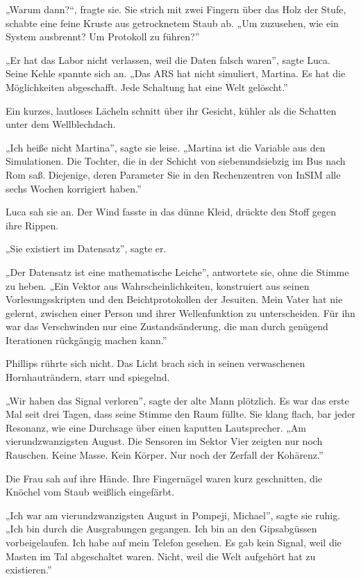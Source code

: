 \documentclass[
  ngerman,
]{article}
\begin{document}
„Warum dann?``, fragte sie. Sie strich mit zwei Fingern über das Holz
der Stufe, schabte eine feine Kruste aus getrocknetem Staub ab. „Um
zuzusehen, wie ein System ausbrennt? Um Protokoll zu führen?''

„Er hat das Labor nicht verlassen, weil die Daten falsch waren'', sagte
Luca. Seine Kehle spannte sich an. „Das ARS hat nicht simuliert,
Martina. Es hat die Möglichkeiten abgeschafft. Jede Schaltung hat eine
Welt gelöscht.''

Ein kurzes, lautloses Lächeln schnitt über ihr Gesicht, kühler als die
Schatten unter dem Wellblechdach.

„Ich heiße nicht Martina'', sagte sie leise. „Martina ist die Variable
aus den Simulationen. Die Tochter, die in der Schicht von
siebenundsiebzig im Bus nach Rom saß. Diejenige, deren Parameter Sie in
den Rechenzentren von InSIM alle sechs Wochen korrigiert haben.''

Luca sah sie an. Der Wind fasste in das dünne Kleid, drückte den Stoff
gegen ihre Rippen.

„Sie existiert im Datensatz'', sagte er.

„Der Datensatz ist eine mathematische Leiche'', antwortete sie, ohne die
Stimme zu heben. „Ein Vektor aus Wahrscheinlichkeiten, konstruiert aus
seinen Vorlesungsskripten und den Beichtprotokollen der Jesuiten. Mein
Vater hat nie gelernt, zwischen einer Person und ihrer Wellenfunktion zu
unterscheiden. Für ihn war das Verschwinden nur eine Zustandsänderung,
die man durch genügend Iterationen rückgängig machen kann.''

Phillips rührte sich nicht. Das Licht brach sich in seinen verwaschenen
Hornhauträndern, starr und spiegelnd.

„Wir haben das Signal verloren'', sagte der alte Mann plötzlich. Es war
das erste Mal seit drei Tagen, dass seine Stimme den Raum füllte. Sie
klang flach, bar jeder Resonanz, wie eine Durchsage über einen kaputten
Lautsprecher. „Am vierundzwanzigsten August. Die Sensoren im Sektor Vier
zeigten nur noch Rauschen. Keine Masse. Kein Körper. Nur noch der
Zerfall der Kohärenz.''

Die Frau sah auf ihre Hände. Ihre Fingernägel waren kurz geschnitten,
die Knöchel vom Staub weißlich eingefärbt.

„Ich war am vierundzwanzigsten August in Pompeji, Michael'', sagte sie
ruhig. „Ich bin durch die Ausgrabungen gegangen. Ich bin an den
Gipsabgüssen vorbeigelaufen. Ich habe auf mein Telefon gesehen. Es gab
kein Signal, weil die Masten im Tal abgeschaltet waren. Nicht, weil die
Welt aufgehört hat zu existieren.''
\end{document}
